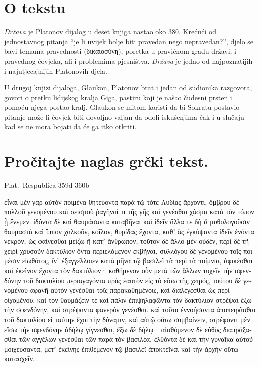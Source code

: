 


\section*{O tekstu}

\textit{Država} je Platonov dijalog u deset knjiga nastao oko 380. Krećući od jednostavnog pitanja ``je li uvijek bolje biti pravedan nego nepravedan?'', djelo se bavi temama pravednosti (δικαιοσύνη), poretka u pravičnom gradu-državi, i pravednog čovjeka, ali i problemima pjesništva. \textit{Država} je jedno od najpoznatijih i najutjecajnijih Platonovih djela.

U drugoj knjizi dijaloga, Glaukon, Platonov brat i jedan od sudionika razgovora, govori o pretku lidijskog kralja Giga, pastiru koji je našao čudesni prsten i pomoću njega postao kralj. Glaukon se mitom koristi da bi Sokratu postavio pitanje može li čovjek biti dovoljno valjan da odoli iskušenjima čak i u slučaju kad se ne mora bojati da će ga itko otkriti.



\section*{Pročitajte naglas grčki tekst.}

Plat.\ Respublica 359d-360b


\medskip


{\large

\begin{greek}

\noindent εἶναι μὲν γὰρ αὐτὸν ποιμένα θητεύοντα παρὰ τῷ τότε Λυδίας ἄρχοντι, ὄμβρου δὲ πολλοῦ γενομένου καὶ σεισμοῦ ῥαγῆναί τι τῆς γῆς καὶ γενέσθαι χάσμα κατὰ τὸν τόπον ᾗ ἔνεμεν. ἰδόντα δὲ καὶ θαυμάσαντα καταβῆναι καὶ ἰδεῖν ἄλλα τε δὴ ἃ μυθολογοῦσιν θαυμαστὰ καὶ ἵππον χαλκοῦν, κοῖλον, θυρίδας ἔχοντα, καθʼ ἃς ἐγκύψαντα ἰδεῖν ἐνόντα νεκρόν, ὡς φαίνεσθαι μείζω ἢ κατʼ ἄνθρωπον, τοῦτον δὲ ἄλλο μὲν οὐδέν, περὶ δὲ τῇ χειρὶ χρυσοῦν δακτύλιον ὄντα περιελόμενον ἐκβῆναι. συλλόγου δὲ γενομένου τοῖς ποιμέσιν εἰωθότος, ἵνʼ ἐξαγγέλλοιεν κατὰ μῆνα τῷ βασιλεῖ τὰ περὶ τὰ ποίμνια, ἀφικέσθαι καὶ ἐκεῖνον ἔχοντα τὸν δακτύλιον· καθήμενον οὖν μετὰ τῶν ἄλλων τυχεῖν τὴν σφενδόνην τοῦ δακτυλίου περιαγαγόντα πρὸς ἑαυτὸν εἰς τὸ εἴσω τῆς χειρός, τούτου δὲ γενομένου ἀφανῆ αὐτὸν γενέσθαι τοῖς παρακαθημένοις, καὶ διαλέγεσθαι ὡς περὶ οἰχομένου. καὶ τὸν θαυμάζειν τε καὶ πάλιν ἐπιψηλαφῶντα τὸν δακτύλιον στρέψαι ἔξω τὴν σφενδόνην, καὶ στρέψαντα φανερὸν γενέσθαι. καὶ τοῦτο ἐννοήσαντα ἀποπειρᾶσθαι τοῦ δακτυλίου εἰ ταύτην ἔχοι τὴν δύναμιν, καὶ αὐτῷ οὕτω συμβαίνειν, στρέφοντι μὲν εἴσω τὴν σφενδόνην ἀδήλῳ γίγνεσθαι, ἔξω δὲ δήλῳ· αἰσθόμενον δὲ εὐθὺς διαπράξασθαι τῶν ἀγγέλων γενέσθαι τῶν παρὰ τὸν βασιλέα, ἐλθόντα δὲ καὶ τὴν γυναῖκα αὐτοῦ μοιχεύσαντα, μετʼ ἐκείνης ἐπιθέμενον τῷ βασιλεῖ ἀποκτεῖναι καὶ τὴν ἀρχὴν οὕτω κατασχεῖν.

\end{greek}

}


